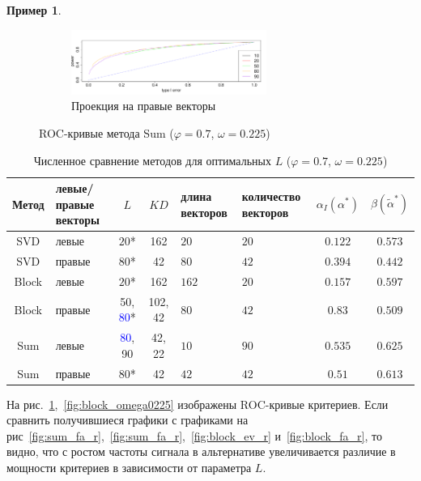 \documentclass[specialist,
substylefile = spbu_report.rtx,
subf,href,colorlinks=true, 12pt]{disser}
\theoremstyle{definition}
\newtheorem{example}{Пример}
\begin{document}
\begin{example}
\begin{figure}[h!]
\begin{subfigure}[t]{\textwidth}
		\end{subfigure}
		\begin{subfigure}[t]{\textwidth}
			\centering
			\includegraphics[width=0.7\textwidth]{img/roc_sum_fa_omega0225.pdf}
			\caption{Проекция на правые векторы}
		\end{subfigure}
		\caption{ROC-кривые метода Sum ($\varphi=0.7$, $\omega=0.225$)}
		\label{fig:sum_omega0225}
	\end{figure}
	\begin{table}[h]
		\caption{Численное сравнение методов для оптимальных $L$ ($\varphi=0.7$, $\omega=0.225$)}
		\label{tab:res_mc-mssa_omega0225}
		\centering
		\begin{tabular}{|c>{\centering\arraybackslash}m{1in}cc>{\centering\arraybackslash}m{1in} >{\centering\arraybackslash}m{1in}cc|}\hline
			Метод & левые/правые векторы & $L$ & $KD$ & длина векторов & количество векторов & $\alpha_I(\alpha^*)$ & $\beta(\widetilde{\alpha}^*)$ \\
			\hline
			SVD & левые & $20$* & 162 & $20$ & $20$ & $0.122$ & $0.573$ \\
			\hline
			SVD  & правые & $80$* & 42 & $80$ & $42$ & $0.394$ & $0.442$ \\
			\hline
			Block & левые & $20$* & 162 & $162$ & $20$ & $0.157$ & $\mathbf{0.597}$ \\
			\hline
			Block & правые & 50, \textcolor{blue}{80}* & 102, 42 & $80$ & $42$ & $0.83$ & $0.509$\\
			\hline
			Sum & левые & \textcolor{blue}{80}, 90 & 42, 22 & $10$ & $90$ & $0.535$ & $\mathbf{0.625}$ \\
			\hline
			Sum & правые & $80$* & 42 & $42$ & $42$ & $0.51$ & $\mathbf{0.613}$ \\
			\hline
		\end{tabular}
	
	\end{table}
	На рис.~\ref{fig:sum_omega0225},~\ref{fig:block_omega0225} изображены ROC-кривые критериев. Если сравнить получившиеся графики с графиками на рис~\ref{fig:sum_fa_r},~\ref{fig:sum_fa_r},~\ref{fig:block_ev_r} и~\ref{fig:block_fa_r}, то видно, что с ростом частоты сигнала в альтернативе увеличивается различие в мощности критериев в зависимости от параметра $L$. 
	
\end{example}
\end{document}
